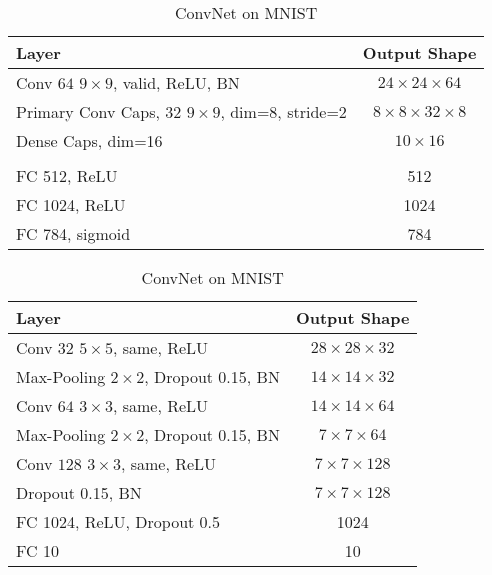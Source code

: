 \begin{table}
	\centering
	
	\begin{tabular}{lc}
		\toprule 
		Layer	&  Output Shape \\ 
		\midrule 
		Conv $64$ $9\times9$, valid, ReLU, BN & $24\times24\times64$ \\ 
		\midrule 
		Primary Conv Caps, $32$ $9\times9$, dim=$8$, stride=2	&  $8\times8\times32\times8$ \\ 
		\midrule 
		Dense Caps, dim=16	& $10\times16$ \\ 
		\midrule 
		& \\
		\midrule
		FC 512, ReLU	& 512 \\
		\midrule
		FC 1024, ReLU	& 1024 \\
		\midrule
		FC 784, sigmoid	& 784 \\
		\bottomrule
	\end{tabular} 
	\caption{CapsNet on MNIST}
	\label{tab:capsnet:mnist}

	\vspace{0.75cm}
	
	\begin{tabular}{lc}
		\toprule 
		Layer	&  Output Shape \\ 
		\midrule 
		Conv $32$ $5\times5$, same,	ReLU & $28\times28\times32$ \\ 
		\midrule 
		Max-Pooling $2\times2$, Dropout 0.15, BN	&  $14\times14\times32$ \\ 
		\midrule 
		Conv $64$ $3\times3$, same, ReLU	& $14\times14\times64$ \\ 
		\midrule 
		Max-Pooling $2\times2$, Dropout 0.15, BN	& $7\times7\times64$ \\
		\midrule
		Conv $128$ $3\times3$, same, ReLU	& $7\times7\times128$ \\
		\midrule
		Dropout 0.15, BN	& $7\times7\times128$ \\
		\midrule
		FC 1024, ReLU, Dropout 0.5 & 1024 \\
		\midrule
		FC 10 & 10\\
		\bottomrule
	\end{tabular} 
	\caption{ConvNet on MNIST}
	\label{tab:convnet:mnist}
\end{table}



